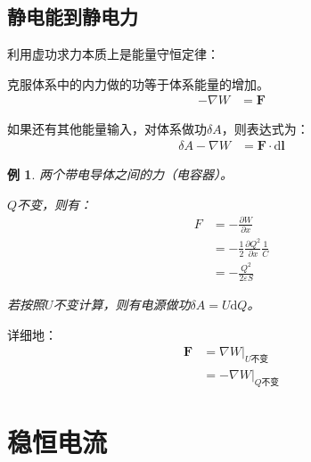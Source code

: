 \documentclass[12pt,onecolumn,a4paper]{book}
\newtheorem*{example}{例}
\numberwithin{table}{subsection}
\numberwithin{equation}{subsection}
\begin{document}
\section{静电能到静电力}

利用虚功求力本质上是能量守恒定律：

克服体系中的内力做的功等于体系能量的增加。
\begin{align}
    - \nabla W & = \mathbf{F}
\end{align}

如果还有其他能量输入，对体系做功$\delta A$，则表达式为：
\begin{align}
    \delta A - \nabla W & = \mathbf{F} \cdot \mathrm{d} \mathbf{l}
\end{align}

\begin{example}
    两个带电导体之间的力（电容器）。

    $Q$不变，则有：
    \begin{align}
        F & =- \frac{\partial W}{\partial x}                            \\
          & = - \frac{1}{2} \frac{\partial Q^2}{\partial x} \frac{1}{C} \\
          & = -\frac{Q^2}{2 \varepsilon S}
    \end{align}

    若按照$U$不变计算，则有电源做功$\delta A = U \mathrm{d} Q$。

\end{example}

详细地：
\begin{align}
    \mathbf{F} & = \nabla W |_\text{$U$不变}   \\
               & = - \nabla W |_\text{$Q$不变}
\end{align}

\chapter{稳恒电流}
\end{document}
